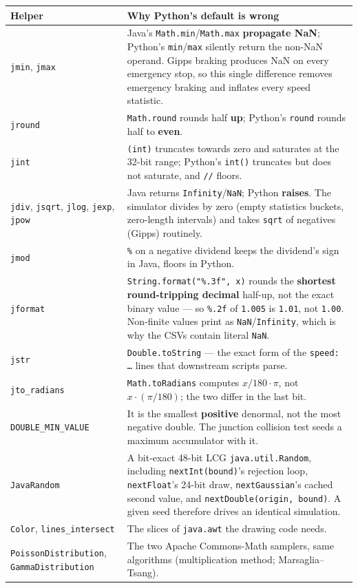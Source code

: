 \documentclass[11pt, a4paper]{article}
\newcommand{\code}[1]{\texttt{#1}}
\begin{document}
\begin{tabularx}{\textwidth}{l X}
\toprule
\textbf{Helper} & \textbf{Why Python's default is wrong} \\
\midrule
\code{jmin}, \code{jmax} & Java's \code{Math.min}/\code{Math.max} \textbf{propagate NaN}; Python's \code{min}/\code{max} silently return the non-NaN operand. Gipps braking produces NaN on every emergency stop, so this single difference removes emergency braking and inflates every speed statistic. \\
\code{jround} & \code{Math.round} rounds half \textbf{up}; Python's \code{round} rounds half to \textbf{even}. \\
\code{jint} & \code{(int)} truncates towards zero and saturates at the 32-bit range; Python's \code{int()} truncates but does not saturate, and \code{//} floors. \\
\code{jdiv}, \code{jsqrt}, \code{jlog}, \code{jexp}, \code{jpow} & Java returns \code{Infinity}/\code{NaN}; Python \textbf{raises}. The simulator divides by zero (empty statistics buckets, zero-length intervals) and takes \code{sqrt} of negatives (Gipps) routinely. \\
\code{jmod} & \code{\%} on a negative dividend keeps the dividend's sign in Java, floors in Python. \\
\code{jformat} & \code{String.format("\%.3f", x)} rounds the \textbf{shortest round-tripping decimal} half-up, not the exact binary value --- so \code{\%.2f} of \code{1.005} is \code{1.01}, not \code{1.00}. Non-finite values print as \code{NaN}/\code{Infinity}, which is why the CSVs contain literal \code{NaN}. \\
\code{jstr} & \code{Double.toString} --- the exact form of the \code{speed: \dots} lines that downstream scripts parse. \\
\code{jto\_radians} & \code{Math.toRadians} computes $x/180 \cdot \pi$, not $x \cdot (\pi/180)$; the two differ in the last bit. \\
\code{DOUBLE\_MIN\_VALUE} & It is the smallest \textbf{positive} denormal, not the most negative double. The junction collision test seeds a maximum accumulator with it. \\
\code{JavaRandom} & A bit-exact 48-bit LCG \code{java.util.Random}, including \code{nextInt(bound)}'s rejection loop, \code{nextFloat}'s 24-bit draw, \code{nextGaussian}'s cached second value, and \code{nextDouble(origin, bound)}. A given seed therefore drives an identical simulation. \\
\code{Color}, \code{lines\_intersect} & The slices of \code{java.awt} the drawing code needs. \\
\code{PoissonDistribution}, \code{GammaDistribution} & The two Apache Commons-Math samplers, same algorithms (multiplication method; Marsaglia--Tsang). \\
\bottomrule
\end{tabularx}
\end{document}
